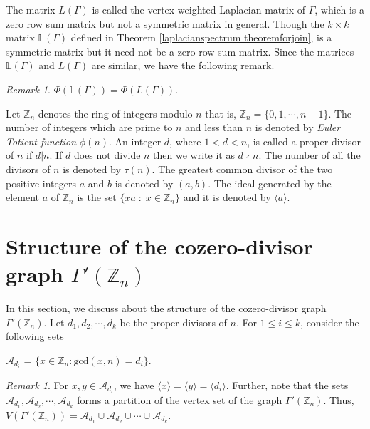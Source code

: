 \documentclass{amsart}
\theoremstyle{plain}
\theoremstyle{definition}
\theoremstyle{remark}
\newtheorem{remark}[theorem]{Remark}
\begin{document}
The matrix $L(\Gamma)$ is called the vertex weighted Laplacian matrix of $\Gamma$, which is a zero row sum matrix but not a symmetric matrix in general.
Though the $k \times k$ matrix $\mathbb{L}(\Gamma)$ defined in Theorem \ref{laplacianspectrum theoremforjoin}, is a symmetric matrix but it need not be a zero row sum matrix. Since the matrices $\mathbb{L}(\Gamma)$  and $L(\Gamma)$ are similar, we have the following remark.
\begin{remark}\label{laplacianremark}
$\Phi(\mathbb{L}(\Gamma)) = \Phi(L(\Gamma))$.
\end{remark}
Let $\mathbb{Z}_n$ denotes the ring of integers modulo $n$ that is, $\mathbb{Z}_n = \{0, 1, \cdots, n-1\}$. The number of integers which are prime to $n$ and less than $n$ is denoted by \emph{Euler Totient function} $\phi(n)$. An integer $d$, where $1 < d < n$, is called a proper divisor of $n$ if $d|n$. If $d$ does not divide $n$ then we write it as $d \nmid n$. The number of all the divisors of $n$ is denoted by $\tau(n)$. The greatest common divisor of the two positive integers $a$ and $b$ is denoted by $(a, b)$. The ideal generated by the element $a$ of $\mathbb{Z}_n$ is the set $\{xa \; : \; x \in \mathbb{Z}_n\}$ and it is denoted by $\langle a \rangle$. %




\section{Structure of the cozero-divisor graph $\Gamma'(\mathbb{Z}_n)$}
In this section, we discuss about the structure of the cozero-divisor graph $\Gamma'(\mathbb{Z}_n)$.  Let $d_1, d_2, \cdots, d_k$ be the proper divisors of $n$. For $1 \leq i \leq k$, consider the following sets
\begin{center}
    $\mathcal{A}_{d_{i}}$ = $\{ x \in \mathbb{Z}_{n}: \text{gcd}(x,n) = d_{i}\}$.
\end{center}

\begin{remark}\label{partition}
For $x, y \in \mathcal{A}_{d_{i}}$, we have $\langle x \rangle = \langle y \rangle = \langle d_i \rangle$. Further, note that the sets $\mathcal{A}_{d_{1}}, \mathcal{A}_{d_{2}}, \cdots, \mathcal{A}_{d_{k}}$ forms a partition of the vertex set of the graph $\Gamma'(\mathbb{Z}_n)$. Thus, $V(\Gamma'(\mathbb{Z}_n)) = \mathcal{A}_{d_{1}} \cup \mathcal{A}_{d_{2}} \cup \cdots \cup \mathcal{A}_{d_{k}}$. 
\end{remark}
\end{document}
